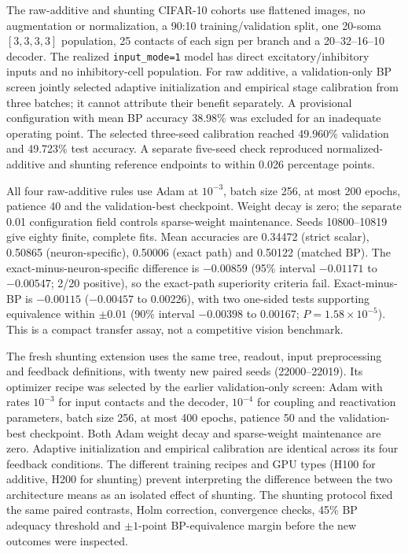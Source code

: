 The raw-additive and shunting CIFAR-10 cohorts use flattened images, no augmentation or normalization, a 90:10 training/validation split, one 20-soma $[3,3,3,3]$ population, 25 contacts of each sign per branch and a 20--32--16--10 decoder. The realized \texttt{input\_mode=1} model has direct excitatory/inhibitory inputs and no inhibitory-cell population. For raw additive, a validation-only BP screen jointly selected adaptive initialization and empirical stage calibration from three batches; it cannot attribute their benefit separately. A provisional configuration with mean BP accuracy 38.98\% was excluded for an inadequate operating point. The selected three-seed calibration reached 49.960\% validation and 49.723\% test accuracy. A separate five-seed check reproduced normalized-additive and shunting reference endpoints to within 0.026 percentage points.

All four raw-additive rules use Adam at $10^{-3}$, batch size 256, at most 200 epochs, patience 40 and the validation-best checkpoint. Weight decay is zero; the separate 0.01 configuration field controls sparse-weight maintenance. Seeds 10800--10819 give eighty finite, complete fits. Mean accuracies are 0.34472 (strict scalar), 0.50865 (neuron-specific), 0.50006 (exact path) and 0.50122 (matched BP). The exact-minus-neuron-specific difference is $-0.00859$ (95\% interval $-0.01171$ to $-0.00547$; 2/20 positive), so the exact-path superiority criteria fail. Exact-minus-BP is $-0.00115$ ($-0.00457$ to 0.00226), with two one-sided tests supporting equivalence within $\pm0.01$ (90\% interval $-0.00398$ to 0.00167; $P=1.58\times10^{-5}$). This is a compact transfer assay, not a competitive vision benchmark.

The fresh shunting extension uses the same tree, readout, input preprocessing and feedback definitions, with twenty new paired seeds (22000--22019). Its optimizer recipe was selected by the earlier validation-only screen: Adam with rates $10^{-3}$ for input contacts and the decoder, $10^{-4}$ for coupling and reactivation parameters, batch size 256, at most 400 epochs, patience 50 and the validation-best checkpoint. Both Adam weight decay and sparse-weight maintenance are zero. Adaptive initialization and empirical calibration are identical across its four feedback conditions. The different training recipes and GPU types (H100 for additive, H200 for shunting) prevent interpreting the difference between the two architecture means as an isolated effect of shunting. The shunting protocol fixed the same paired contrasts, Holm correction, convergence checks, 45\% BP adequacy threshold and $\pm1$-point BP-equivalence margin before the new outcomes were inspected.

